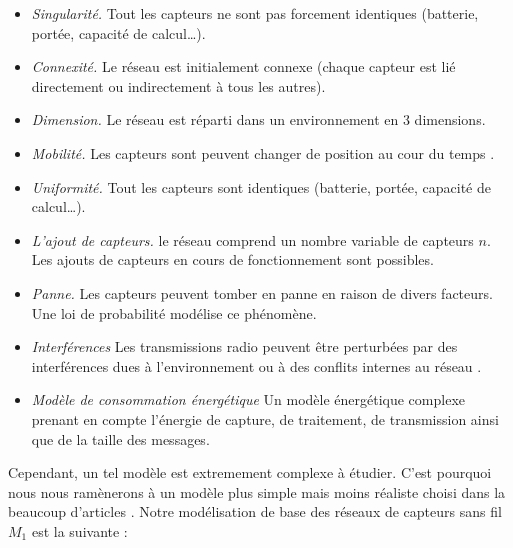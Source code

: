 \begin{itemize}

 \item \textit{Singularité.} Tout les capteurs ne sont pas forcement identiques (batterie, portée, capacité de calcul…)\cite{Akyildiz2002}. 
 \item \textit{Connexité.} Le réseau est initialement connexe (chaque capteur est lié directement ou indirectement à tous les autres). 
 \item \textit{Dimension.} Le réseau est réparti dans un environnement en 3 dimensions.
 \item \textit{Mobilité.} Les capteurs sont peuvent changer de position au cour du temps \cite{Giordano2003}.
 \item \textit{Uniformité.} Tout les capteurs sont identiques (batterie, portée, capacité de calcul…).  
 \item \textit{L'ajout de capteurs.} le réseau comprend un nombre variable de capteurs $n$. Les ajouts de capteurs en cours de fonctionnement sont possibles.
 \item \textit{Panne.} Les capteurs peuvent tomber en panne en raison de divers facteurs. Une loi de probabilité modélise ce phénomène.   
 \item \textit{Interférences} Les transmissions radio peuvent être perturbées par des interférences dues à l'environnement ou à des conflits internes au réseau \cite{Agarwal2005}.
 \item \textit{Modèle de consommation énergétique} Un modèle énergétique complexe prenant en compte l'énergie de capture, de traitement, de transmission ainsi que de la taille des messages. \cite{Deng2005}
 
\end{itemize}

Cependant, un tel modèle est extremement complexe à étudier. C'est pourquoi nous nous ramènerons à un modèle plus simple mais moins réaliste choisi dans la beaucoup d'articles  \cite{Cartigny2003LMEB,Ingelrest2004}.
Notre modélisation de base des réseaux de capteurs sans fil \textbf{$M_1$} est la suivante :

